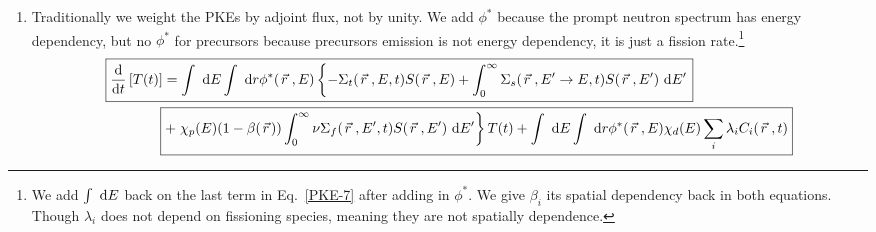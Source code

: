 \documentclass{school-22.211-notes}
\begin{document}
\begin{enumerate}
\item Traditionally we weight the PKEs by adjoint flux, not by unity.  We add $\phi^*$ because the prompt neutron spectrum has energy dependency, but no $\phi^*$ for precursors because precursors emission is not energy dependency, it is just a fission rate.\footnote{We add $\int \mbox{ }\mathrm{d} E$ back on the last term in Eq.~\ref{PKE-7} after adding in $\phi^*$. We give $\beta_i$ its spatial dependency back in both equations. Though $\lambda_i$ does not depend on fissioning species, meaning they are not spatially dependence.}
  \begin{align}
  \Aboxed{ \ddt \left[ T(t) \right] &=  
    \int \dE \int \dr  \phi^* (\vecr, E) \left\{  - \Sigma_t (\vecr, E, t) S(\vecr, E)   + \int_0^{\infty} \Sigma_s (\vecr, E'\to E, t) S(\vecr, E') \dE'  \right. } \notag \\
    \Aboxed{ &+  \left. \chi_p (E) (1-\beta (\vecr)) \int_0^{\infty} \nu \Sigma_f (\vecr, E', t) S(\vecr, E') \dE'  \right\} T(t)  + \int \dE \int \dr \phi^*(\vecr, E)  \chi_d (E) \Sum_i \lambda_i C_i (\vecr, t)  }   \label{PKE-8}
  \end{align}
\end{enumerate}
\end{document}
